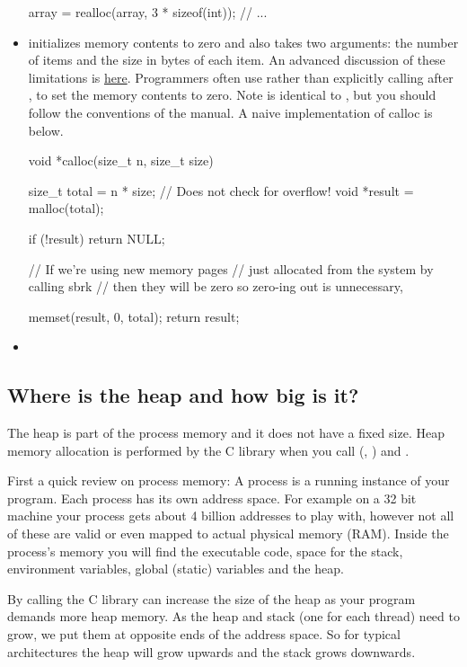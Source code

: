 \begin{itemize}
\begin{code}[language=C]
array = realloc(array, 3 * sizeof(int));
// ...
\end{code}

\item {} initializes memory contents to zero and also takes two arguments: the number of items and the size in bytes of each item. An advanced discussion of these limitations is \href{http://locklessinc.com/articles/calloc/}{here}. Programmers often use  rather than explicitly calling  after , to set the memory contents to zero. Note  is identical to , but you should follow the conventions of the manual. A naive implementation of calloc is below.

\begin{code}[language=C]
void *calloc(size_t n, size_t size)
{
    size_t total = n * size; // Does not check for overflow!
    void *result = malloc(total);
    
    if (!result) return NULL;
    
// If we're using new memory pages 
// just allocated from the system by calling sbrk
// then they will be zero so zero-ing out is unnecessary,

    memset(result, 0, total);
    return result; 
}
\end{code}

\item {}
\end{itemize}

\subsection{Where is the heap and how big is it?}

The heap is part of the process memory and it does not have a fixed size. Heap memory allocation is performed by the C library when you call  (, ) and .

First a quick review on process memory: A process is a running instance of your program. Each process has its own address space. For example on a 32 bit machine your process gets about 4 billion addresses to play with, however not all of these are valid or even mapped to actual physical memory (RAM). Inside the process's memory you will find the executable code, space for the stack, environment variables, global (static) variables and the heap.

By calling  the C library can increase the size of the heap as your program demands more heap memory. As the heap and stack (one for each thread) need to grow, we put them at opposite ends of the address space. So for typical architectures the heap will grow upwards and the stack grows downwards.

